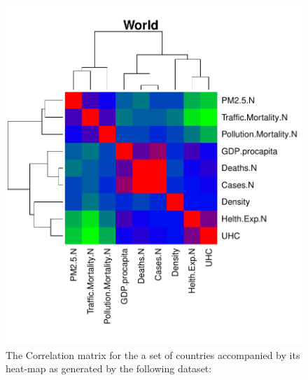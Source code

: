 \documentclass[
12pt, %
a4paper, %
oneside, %
headinclude,footinclude, %
BCOR5mm, %
]{scrartcl}
\begin{document}
\begin{figure}[h]
\begin{center}
\includegraphics[scale=1]{Pic/CorrMatrix_WORLD.pdf}
\caption{The Correlation matrix for the a set of countries accompanied by its heat-map as generated by the following dataset:  }
\label{World_CorrMatrix}
\end{center}
\end{figure}
\end{document}
